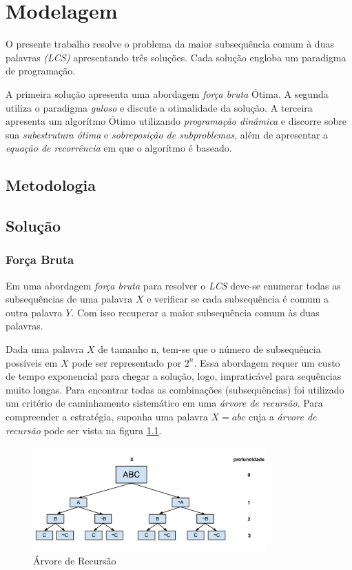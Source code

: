 \chapter{Modelagem}

O presente trabalho resolve o problema da maior subsequência comum à 
duas palavras \emph{(LCS)} apresentando três soluções. Cada solução 
engloba um paradigma de programação.

A primeira solução apresenta uma abordagem \emph{força bruta} Ótima. A 
segunda utiliza o paradigma \emph{guloso} e discute a otimalidade da 
solução. A terceira apresenta um algorítmo Ótimo utilizando 
\emph{programação dinâmica} e discorre sobre sua \emph{subestrutura 
ótima} e \emph{sobreposição de subproblemas}, além de apresentar a 
\emph{equação de recorrência} em que o algorítmo é baseado.

\section{Metodologia}


\section{Solução}

\subsection{Força Bruta}

Em uma abordagem \emph{força bruta} para resolver o \emph{LCS} deve-se
enumerar todas as subsequências de uma palavra $X$ e verificar se cada
subsequência é comum a outra palavra $Y$. Com isso recuperar a maior 
subsequência comum às duas palavras. 

Dada uma palavra $X$ de tamanho n, tem-se que o número de
subsequência possíveis em $X$ pode ser representado por $2^n$. Essa 
abordagem requer um custo de tempo exponencial para chegar a solução, 
logo, impraticável para sequências muito longas. Para encontrar todas
as combinações (subsequências) foi utilizado um critério de caminhamento
sistemático em uma \emph{árvore de recursão}. Para compreender a 
estratégia, suponha uma palavra $X = abc$ cuja a \emph{árvore de 
recursão} pode ser vista na figura \ref{fig:recursiontree}.

\begin{figure}
\begin{center}
\includegraphics[width=0.8\textwidth,natwidth=610,natheight=642]{doc/recursion-tree.png}
\caption{Árvore de Recursão}
\label{fig:recursiontree}
\end{center}
\end{figure}


